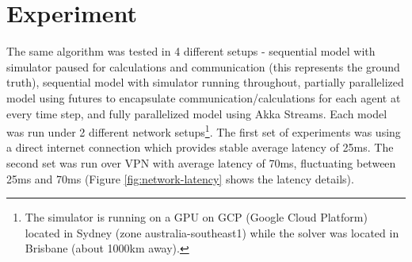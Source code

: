 \documentclass{article}
\begin{document}


%




\section{Experiment}
The same algorithm was tested in 4 different setups - sequential model with simulator paused for calculations and communication (this represents the ground truth), sequential model with simulator running throughout, partially parallelized model using futures to encapsulate communication/calculations for each agent at every time step, and fully parallelized model using Akka Streams. Each model was run under 2 different network setups\footnote{The simulator is running on a GPU on GCP (Google Cloud Platform) located in Sydney (zone australia-southeast1) while the solver was located in Brisbane (about 1000km away).}. The first set of experiments was using a direct internet connection which provides stable average latency of 25ms. The second set was run over VPN with average latency of 70ms, fluctuating between 25ms and 70ms (Figure \ref{fig:network-latency} shows the latency details).
\end{document}
